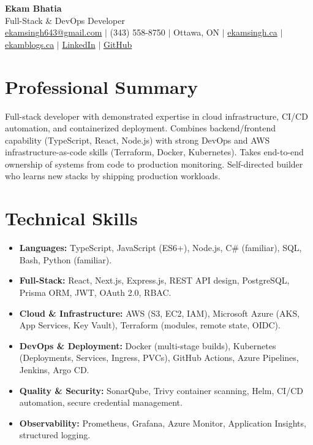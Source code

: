 \documentclass[11pt,a4paper]{article}
\begin{document}
\begin{center}
    {\LARGE \textbf{Ekam Bhatia}} \\
    \vspace{2pt}
    {\normalsize Full-Stack & DevOps Developer} \\
    \vspace{4pt}
    \small
    \href{mailto:ekamsingh643@gmail.com}{ekamsingh643@gmail.com} $|$
    (343) 558-8750 $|$ Ottawa, ON $|$
    \href{https://www.ekamsingh.ca}{ekamsingh.ca} $|$
    \href{https://www.ekamblogs.ca}{ekamblogs.ca} $|$
    \href{https://www.linkedin.com/in/ekam-bhatia-335840168}{LinkedIn} $|$
    \href{https://github.com/bhat0155}{GitHub}
\end{center}

\section{Professional Summary}
Full-stack developer with demonstrated expertise in cloud infrastructure, CI/CD automation, and containerized deployment. Combines backend/frontend capability (TypeScript, React, Node.js) with strong DevOps and AWS infrastructure-as-code skills (Terraform, Docker, Kubernetes). Takes end-to-end ownership of systems from code to production monitoring. Self-directed builder who learns new stacks by shipping production workloads.

\section{Technical Skills}
\begin{itemize}
    \item \textbf{Languages:} TypeScript, JavaScript (ES6+), Node.js, C\# (familiar), SQL, Bash, Python (familiar).
    \item \textbf{Full-Stack:} React, Next.js, Express.js, REST API design, PostgreSQL, Prisma ORM, JWT, OAuth 2.0, RBAC.
    \item \textbf{Cloud \& Infrastructure:} AWS (S3, EC2, IAM), Microsoft Azure (AKS, App Services, Key Vault), Terraform (modules, remote state, OIDC).
    \item \textbf{DevOps \& Deployment:} Docker (multi-stage builds), Kubernetes (Deployments, Services, Ingress, PVCs), GitHub Actions, Azure Pipelines, Jenkins, Argo CD.
    \item \textbf{Quality \& Security:} SonarQube, Trivy container scanning, Helm, CI/CD automation, secure credential management.
    \item \textbf{Observability:} Prometheus, Grafana, Azure Monitor, Application Insights, structured logging.
\end{itemize}
\end{document}
